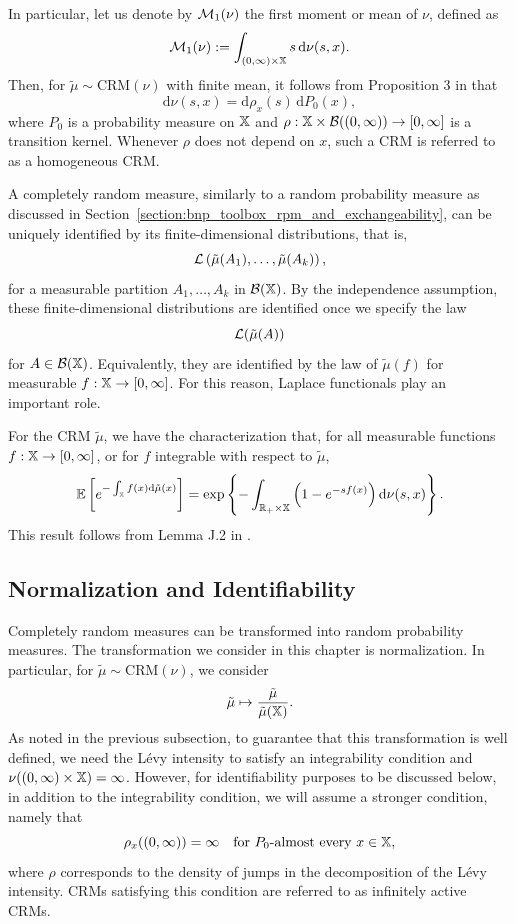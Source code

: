 In particular, let us denote by $\mathcal{M}_1(\nu)$ the first moment or mean of $\nu$, defined as
\[
\mathcal{M}_1(\nu) := \int_{(0,\infty)\times \mathbb{X}} s \,\mathrm{d}\nu(s,x).
\]
Then, for $\tilde{\mu} \sim \mathrm{CRM}(\nu)$ with finite mean, it follows from Proposition 3 in \cite{catalano2026merging} that
\[
\mathrm{d}\nu(s,x) = \mathrm{d}\rho_x(s)\,\mathrm{d}P_0(x),
\]
where $P_0$ is a probability measure on $\mathbb{X}$ and $\rho : \mathbb{X} \times \mathcal{B}((0,\infty)) \to [0,\infty]$ is a transition kernel. Whenever $\rho$ does not depend on $x$, such a CRM is referred to as a homogeneous CRM.

A completely random measure, similarly to a random probability measure as discussed in Section~\ref{section:bnp_toolbox_rpm_and_exchangeability}, can be uniquely identified by its finite-dimensional distributions, that is,
\[
\mathcal{L}\left(\tilde{\mu}(A_1), \dots, \tilde{\mu}(A_k) \right),
\]
for a measurable partition $A_1,\dots, A_k$ in $\mathcal{B}(\mathbb{X})$. By the independence assumption, these finite-dimensional distributions are identified once we specify the law
\[
\mathcal{L}(\tilde{\mu}(A))
\]
for $A \in \mathcal{B}(\mathbb{X})$. Equivalently, they are identified by the law of $\tilde{\mu}(f)$ for measurable $f : \mathbb{X} \to [0, \infty]$. For this reason, Laplace functionals play an important role.

For the CRM $\tilde{\mu}$, we have the characterization that, for all measurable functions $f : \mathbb{X} \to [0, \infty]$, or for $f$ integrable with respect to $\tilde{\mu}$,
\[
\mathbb{E} \left[ e ^ {-\int_{\mathbb{X}} f(x) \mathrm{d}\tilde{\mu}(x)}\right] = \exp \left\{-\int_{\mathbb{R}_+ \times \mathbb{X}}\left( 1 - e^{-sf(x)}\right)\mathrm{d}\nu(s,x) \right\}.
\]
This result follows from Lemma J.2 in \cite{ghosal2017fundamentals}.

\subsection{Normalization and Identifiability}\label{subsection:bnp_toolbox_normalization_identifiability}
Completely random measures can be transformed into random probability measures. The transformation we consider in this chapter is normalization. In particular, for $\tilde{\mu} \sim \mathrm{CRM}(\nu)$, we consider 
\[
\tilde{\mu} \mapsto \frac{\tilde{\mu}}{\tilde{\mu}(\mathbb{X})}.
\]
As noted in the previous subsection, to guarantee that this transformation is well defined, we need the Lévy intensity to satisfy an integrability condition and $\nu((0,\infty)\times\mathbb{X}) = \infty$. However, for identifiability purposes to be discussed below, in addition to the integrability condition, we will assume a stronger condition, namely that 
\[
\rho_x((0,\infty)) = \infty \quad \text{for $P_0$-almost every } x \in \mathbb{X},
\]
where $\rho$ corresponds to the density of jumps in the decomposition of the Lévy intensity. CRMs satisfying this condition are referred to as infinitely active CRMs.

